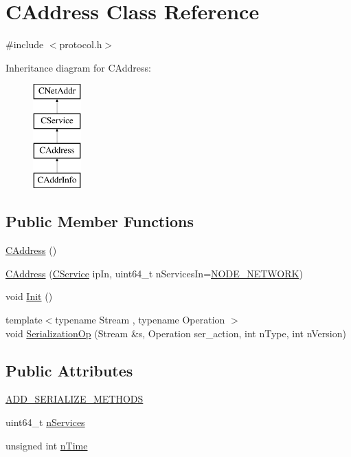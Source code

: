 \hypertarget{class_c_address}{}\section{C\+Address Class Reference}
\label{class_c_address}


{\ttfamily \#include $<$protocol.\+h$>$}

Inheritance diagram for C\+Address\+:\begin{figure}[H]
\begin{center}
\leavevmode
\includegraphics[height=4.000000cm]{class_c_address}
\end{center}
\end{figure}
\subsection*{Public Member Functions}
\begin{DoxyCompactItemize}
\item 
\hyperlink{class_c_address_a84cd336180580ab69b8888a4339ccc37}{C\+Address} ()
\item 
\hyperlink{class_c_address_a806e75f363ec49bfab92a686a8774ac3}{C\+Address} (\hyperlink{class_c_service}{C\+Service} ip\+In, uint64\+\_\+t n\+Services\+In=\hyperlink{protocol_8h_adc29c2ff13d900c2f185ee95427fb06ca9d1154f0e7e56f183a5c8373abe2e86c}{N\+O\+D\+E\+\_\+\+N\+E\+T\+W\+O\+R\+K})
\item 
void \hyperlink{class_c_address_ac060c84dcf47b8ccfae0142c9b29a243}{Init} ()
\item 
{\footnotesize template$<$typename Stream , typename Operation $>$ }\\void \hyperlink{class_c_address_aec10c7075404eefbcf6f7a4c5671be02}{Serialization\+Op} (Stream \&s, Operation ser\+\_\+action, int n\+Type, int n\+Version)
\end{DoxyCompactItemize}
\subsection*{Public Attributes}
\begin{DoxyCompactItemize}
\item 
\hyperlink{class_c_address_a9582fc22433b2ed275d4b65fb72551e7}{A\+D\+D\+\_\+\+S\+E\+R\+I\+A\+L\+I\+Z\+E\+\_\+\+M\+E\+T\+H\+O\+D\+S}
\item 
uint64\+\_\+t \hyperlink{class_c_address_a6a4a6aa020d0d558f238c7d04dd986c3}{n\+Services}
\item 
unsigned int \hyperlink{class_c_address_ac1c44aac968b11f90ce529b133ae4e9b}{n\+Time}
\end{DoxyCompactItemize}
